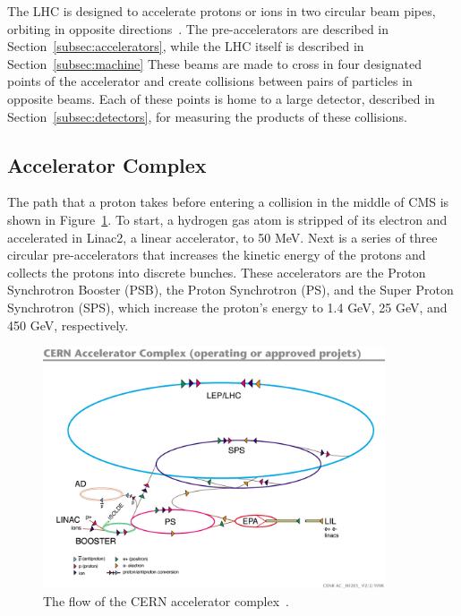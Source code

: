 The LHC is designed to accelerate protons or ions in two circular beam pipes, orbiting in opposite directions~\cite{cern-accelerators}. The pre-accelerators are described in Section~\ref{subsec:accelerators}, while the LHC
itself is described in Section~\ref{subsec:machine}
These beams are made to cross in four designated points of the accelerator and create collisions between
pairs of particles in opposite beams.
Each of these points is home to a large detector, described in Section~\ref{subsec:detectors},
for measuring the products of these collisions.

\subsection{Accelerator Complex\label{subsec:accelerators}}

The path that a proton takes before entering a collision in the middle of CMS is shown in
Figure~\ref{fig:cern_accelerators}. To start, a hydrogen gas atom is
stripped of its electron and accelerated in
Linac2, a linear accelerator, to 50 MeV. Next is a series of three circular pre-accelerators that
increases the kinetic energy of the protons and collects the protons into discrete bunches.
These accelerators are the Proton Synchrotron Booster (PSB), the Proton Synchrotron (PS), and the
Super Proton Synchrotron (SPS), which increase the proton's energy to 1.4 GeV, 25 GeV, and 450 GeV,
respectively. 

\begin{figure}[htbp!]
 \begin{center}
    \includegraphics[width=0.90\textwidth]{figures/experiment/lhc-pho-1991-001.jpg}
      \end{center}
\caption{The flow of the CERN accelerator complex~\cite{Jean-Luc:841493}.}
\label{fig:cern_accelerators}
\end{figure}

